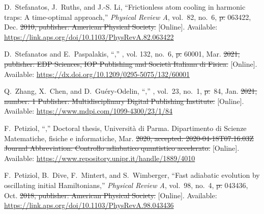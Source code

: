 \documentclass[a4paper,oneside,11pt]{book}
\providecommand{\DIFaddtex}[1]{{\protect\color{blue}\uwave{#1}}} %
\providecommand{\DIFdeltex}[1]{{\protect\color{red}\sout{#1}}}                      %
\providecommand{\DIFaddbegin}{} %
\providecommand{\DIFaddend}{} %
\providecommand{\DIFdelbegin}{} %
\providecommand{\DIFdelend}{} %
\providecommand{\DIFadd}[1]{\texorpdfstring{\DIFaddtex{#1}}{#1}} %
\providecommand{\DIFdel}[1]{\texorpdfstring{\DIFdeltex{#1}}{}} %
\newcommand{\DIFscaledelfig}{0.5}
\newlength{\DIFdelgraphicswidth} %
\newlength{\DIFdelgraphicsheight} %
\newcommand{\DIFaddincludegraphics}[2][]{{\color{blue}\fbox{\DIFOincludegraphics[#1]{#2}}}} %
\newcommand{\DIFdelincludegraphics}[2][]{%
\sbox{\DIFdelgraphicsbox}{\DIFOincludegraphics[#1]{#2}}%
\settoboxwidth{\DIFdelgraphicswidth}{\DIFdelgraphicsbox} %
\settoboxtotalheight{\DIFdelgraphicsheight}{\DIFdelgraphicsbox} %
\scalebox{\DIFscaledelfig}{%
\parbox[b]{\DIFdelgraphicswidth}{\usebox{\DIFdelgraphicsbox}\\[-\baselineskip] \rule{\DIFdelgraphicswidth}{0em}}\llap{\resizebox{\DIFdelgraphicswidth}{\DIFdelgraphicsheight}{%
\setlength{\unitlength}{\DIFdelgraphicswidth}%
\begin{picture}(1,1)%
\thicklines\linethickness{2pt} %
{\color[rgb]{1,0,0}\put(0,0){\framebox(1,1){}}}%
{\color[rgb]{1,0,0}\put(0,0){\line( 1,1){1}}}%
{\color[rgb]{1,0,0}\put(0,1){\line(1,-1){1}}}%
\end{picture}%
}\hspace*{3pt}}} %
} %
\DeclareRobustCommand{\DIFaddbegin}{\DIFOaddbegin \let\includegraphics\DIFaddincludegraphics} %
\DeclareRobustCommand{\DIFaddend}{\DIFOaddend \let\includegraphics\DIFOincludegraphics} %
\DeclareRobustCommand{\DIFdelbegin}{\DIFOdelbegin \let\includegraphics\DIFdelincludegraphics} %
\DeclareRobustCommand{\DIFdelend}{\DIFOaddend \let\includegraphics\DIFOincludegraphics} %
\begin{document}
\begin{thebibliography}{100}
\BIBentryALTinterwordspacing
D.~Stefanatos, J.~Ruths, and J.-S. Li, ``Frictionless atom cooling in harmonic
  traps: {A} time-optimal approach,'' \emph{Physical Review A}, vol.~82, no.~6,
   \DIFdelbegin \DIFdel{p. }\DIFdelend 063422, Dec. \DIFdelbegin \DIFdel{2010, publisher: American Physical Society. }\DIFdelend \DIFaddbegin \DIFadd{2010. }\DIFaddend [Online]. Available:
  \url{https://link.aps.org/doi/10.1103/PhysRevA.82.063422}
\BIBentrySTDinterwordspacing

\BIBentryALTinterwordspacing
D.~Stefanatos and E.~Paspalakis, ``,''
  \emph{}, vol. 132, no.~6,  \DIFdelbegin \DIFdel{p.
  }\DIFdelend 60001,
  Mar. \DIFdelbegin \DIFdel{2021, publisher: EDP Sciences, IOP Publishing and Società
  Italiana di Fisica. }\DIFdelend \DIFaddbegin \DIFadd{2021. }\DIFaddend [Online]. Available:
  \url{https://dx.doi.org/10.1209/0295-5075/132/60001}
\BIBentrySTDinterwordspacing

\BIBentryALTinterwordspacing
Q.~Zhang, X.~Chen, and D.~Guéry-Odelin, ``,'' \emph{}, vol.~23, no.~1,
  \DIFdelbegin \DIFdel{p.}\DIFdelend ~84, Jan. \DIFdelbegin \DIFdel{2021, number: 1 Publisher: Multidisciplinary Digital Publishing
  Institute. }\DIFdelend \DIFaddbegin \DIFadd{2021. }\DIFaddend [Online]. Available:
  \url{https://www.mdpi.com/1099-4300/23/1/84}
\BIBentrySTDinterwordspacing

\BIBentryALTinterwordspacing
F.~Petiziol, ``,'' Doctoral thesis, Università di Parma. Dipartimento di Scienze
  Matematiche, fisiche e informatiche, Mar. \DIFdelbegin \DIFdel{2020, accepted:
  2020-04-18T07:16:03Z Journal Abbreviation: Controllo adiabatico quantistico
  accelerato. }\DIFdelend \DIFaddbegin \DIFadd{2020. }\DIFaddend [Online]. Available:
  \url{https://www.repository.unipr.it/handle/1889/4010}
\BIBentrySTDinterwordspacing

\BIBentryALTinterwordspacing
F.~Petiziol, B.~Dive, F.~Mintert, and S.~Wimberger, ``Fast adiabatic evolution
  by oscillating initial {Hamiltonians},'' \emph{Physical Review A}, vol.~98,
  no.~4,  \DIFdelbegin \DIFdel{p. }\DIFdelend 043436, Oct. \DIFdelbegin \DIFdel{2018, publisher: American Physical Society. }\DIFdelend \DIFaddbegin \DIFadd{2018. }\DIFaddend [Online]. Available:
  \url{https://link.aps.org/doi/10.1103/PhysRevA.98.043436}
\BIBentrySTDinterwordspacing


\end{thebibliography}
\end{document}

